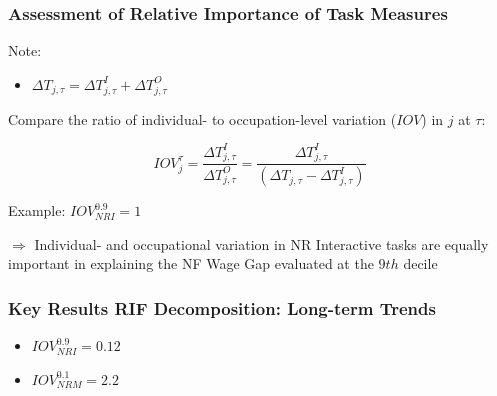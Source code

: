 \documentclass[10pt]{beamer}
\begin{document}
\begin{frame} 
	\frametitle{Assessment of Relative Importance of Task Measures}
	
	
	Note:
	
	\begin{itemize}
		\item $\Delta T_{j, \tau} = \Delta T_{j, \tau}^{I} + \Delta T_{j, \tau}^{O}$
	\end{itemize}
	
	\bigskip
	
	Compare the ratio of individual- to occupation-level variation ($IOV$) in $j$ at $\tau$: 
	
	\begin{equation} \label{iov}
	IOV_{j}^{\tau} = \frac{\Delta T_{j, \tau}^{I}}{\Delta T_{j, \tau}^{O}} =  \frac{\Delta T_{j, \tau}^{I}}{(\Delta T_{j, \tau} - \Delta T_{j, \tau}^{I})} 
	\end{equation}
	
	\bigskip
	
	Example: $IOV_{NRI}^{0.9} = 1$
	
	\medskip
	
	$\Longrightarrow$ Individual- and occupational variation in NR Interactive tasks  are equally important in explaining the NF Wage Gap evaluated at the $9th$ decile 
	
	
\end{frame}


\begin{frame}[label=occ_longterm]
	\frametitle{Key Results RIF Decomposition: Long-term Trends}
	
%	
	
\begin{itemize} 
	\item $IOV_{NRI}^{0.9} = 0.12$
	\item $IOV_{NRM}^{0.1} = 2.2$ 
\end{itemize} 

\hyperlink{regression}{}	
	
\end{frame}
\end{document}
